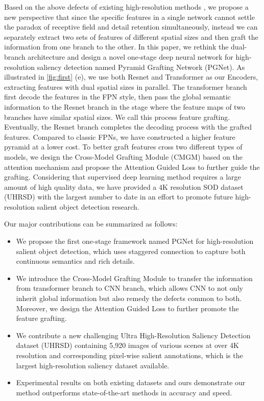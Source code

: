 \documentclass[10pt,twocolumn,letterpaper]{article}
\begin{document}
Based on the above defects of existing high-resolution methods , we propose a new perspective that since the specific features in a single network cannot settle the paradox of receptive field and detail retention simultaneously, instead we can separately extract two sets of features of different spatial sizes and then graft the information from one branch to the other. In this paper, we rethink the dual-branch architecture and design a novel one-stage deep neural network for high-resolution saliency detection named Pyramid Grafting Network (PGNet). As illustrated in \cref{fig:first} (e), we use both Resnet and Transformer as our Encoders, extracting features with dual spatial sizes in parallel. The transformer branch first decode the features in the FPN style, then pass the global semantic information to the Resnet branch in the stage where the feature maps of two branches have similar spatial sizes. We call this process feature grafting. Eventually, the Resnet branch completes the decoding process with the grafted features. Compared to classic FPNs, we have constructed a higher feature pyramid at a lower cost. To better graft features cross two different types of models, we design the Cross-Model Grafting Module (CMGM) based on the attention mechanism and propose the Attention Guided Loss to 
further guide the grafting. Considering that supervised deep learning method requires a large amount of high quality data, we have provided a 4K resolution SOD dataset (UHRSD) with the largest number to date in an effort to promote future high-resolution salient object detection research.


Our major contributions can be summarized as follows:

\begin{itemize}

\item We propose the first one-stage framework named PGNet for high-resolution salient object detection, which uses staggered connection to capture both continuous semantics and rich details.

\item We introduce the Cross-Model Grafting Module to transfer the information from transformer branch to CNN branch, which allows CNN to not only inherit global information but also remedy the defects common to both. Moreover, we design the Attention Guided Loss to further promote the feature grafting.

\item We contribute a new challenging Ultra High-Resolution Saliency Detection dataset (UHRSD) containing 5,920 images of various scenes at over 4K resolution and corresponding pixel-wise salient annotations, which is the largest high-resolution saliency dataset available.

\item Experimental results on both existing datasets and ours demonstrate our method outperforms state-of-the-art methods in accuracy and speed.

\end{itemize}
\end{document}

